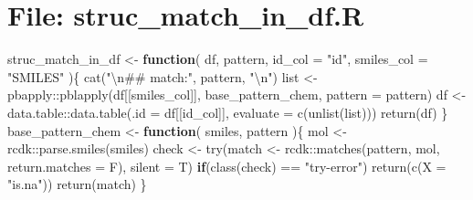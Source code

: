 \documentclass[
]{article}
\newenvironment{Shaded}{\begin{snugshade}}{\end{snugshade}}
\newcommand{\AttributeTok}[1]{\textcolor[rgb]{0.77,0.63,0.00}{#1}}
\newcommand{\ControlFlowTok}[1]{\textcolor[rgb]{0.13,0.29,0.53}{\textbf{#1}}}
\newcommand{\FunctionTok}[1]{\textcolor[rgb]{0.00,0.00,0.00}{#1}}
\newcommand{\NormalTok}[1]{#1}
\newcommand{\OtherTok}[1]{\textcolor[rgb]{0.56,0.35,0.01}{#1}}
\newcommand{\SpecialCharTok}[1]{\textcolor[rgb]{0.00,0.00,0.00}{#1}}
\newcommand{\StringTok}[1]{\textcolor[rgb]{0.31,0.60,0.02}{#1}}
\begin{document}
\hypertarget{file-struc_match_in_df.r}{%
\section{File: struc\_match\_in\_df.R}\label{file-struc_match_in_df.r}}

\begin{Shaded}
\begin{Highlighting}[]
\NormalTok{struc\_match\_in\_df }\OtherTok{\textless{}{-}} 
  \ControlFlowTok{function}\NormalTok{(}
\NormalTok{           df,}
\NormalTok{           pattern,}
           \AttributeTok{id\_col =} \StringTok{"id"}\NormalTok{,}
           \AttributeTok{smiles\_col =} \StringTok{"SMILES"}
\NormalTok{           )\{}
    \FunctionTok{cat}\NormalTok{(}\StringTok{"}\SpecialCharTok{\textbackslash{}n}\StringTok{\#\# match:"}\NormalTok{, pattern, }\StringTok{"}\SpecialCharTok{\textbackslash{}n}\StringTok{"}\NormalTok{)}
\NormalTok{    list }\OtherTok{\textless{}{-}}\NormalTok{ pbapply}\SpecialCharTok{::}\FunctionTok{pblapply}\NormalTok{(df[[smiles\_col]], base\_pattern\_chem,}
                              \AttributeTok{pattern =}\NormalTok{ pattern)}
\NormalTok{    df }\OtherTok{\textless{}{-}}\NormalTok{ data.table}\SpecialCharTok{::}\FunctionTok{data.table}\NormalTok{(}\AttributeTok{.id =}\NormalTok{ df[[id\_col]],}
                                 \AttributeTok{evaluate =} \FunctionTok{c}\NormalTok{(}\FunctionTok{unlist}\NormalTok{(list)))}
    \FunctionTok{return}\NormalTok{(df)}
\NormalTok{  \}}
\NormalTok{base\_pattern\_chem }\OtherTok{\textless{}{-}} 
  \ControlFlowTok{function}\NormalTok{(}
\NormalTok{           smiles,}
\NormalTok{           pattern}
\NormalTok{           )\{}
\NormalTok{    mol }\OtherTok{\textless{}{-}}\NormalTok{ rcdk}\SpecialCharTok{::}\FunctionTok{parse.smiles}\NormalTok{(smiles)}
\NormalTok{    check }\OtherTok{\textless{}{-}} \FunctionTok{try}\NormalTok{(match }\OtherTok{\textless{}{-}}\NormalTok{ rcdk}\SpecialCharTok{::}\FunctionTok{matches}\NormalTok{(pattern, mol, }\AttributeTok{return.matches =}\NormalTok{ F), }\AttributeTok{silent =}\NormalTok{ T)}
    \ControlFlowTok{if}\NormalTok{(}\FunctionTok{class}\NormalTok{(check) }\SpecialCharTok{==} \StringTok{"try{-}error"}\NormalTok{)}
      \FunctionTok{return}\NormalTok{(}\FunctionTok{c}\NormalTok{(}\AttributeTok{X =} \StringTok{"is.na"}\NormalTok{))}
    \FunctionTok{return}\NormalTok{(match)}
\NormalTok{  \}}
\end{Highlighting}
\end{Shaded}
\end{document}
